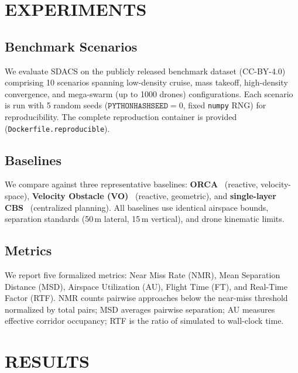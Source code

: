 
\section{EXPERIMENTS}

\subsection{Benchmark Scenarios}

We evaluate SDACS on the publicly released benchmark dataset
(CC-BY-4.0) comprising 10 scenarios spanning low-density cruise,
mass takeoff, high-density convergence, and mega-swarm (up to 1000
drones) configurations. Each scenario is run with 5 random seeds
($\texttt{PYTHONHASHSEED}=0$, fixed \texttt{numpy} RNG) for
reproducibility. The complete reproduction container is provided
(\texttt{Dockerfile.reproducible}).

\subsection{Baselines}

We compare against three representative baselines:
\textbf{ORCA}~\cite{vandenberg2011orca} (reactive, velocity-space),
\textbf{Velocity Obstacle (VO)}~\cite{fiorini1998vo} (reactive,
geometric), and \textbf{single-layer CBS}~\cite{sharon2015cbs}
(centralized planning). All baselines use identical airspace bounds,
separation standards (50\,m lateral, 15\,m vertical), and drone
kinematic limits.

\subsection{Metrics}

We report five formalized metrics: Near Miss Rate (NMR), Mean
Separation Distance (MSD), Airspace Utilization (AU), Flight Time
(FT), and Real-Time Factor (RTF). NMR counts pairwise approaches
below the near-miss threshold normalized by total pairs; MSD averages
pairwise separation; AU measures effective corridor occupancy; RTF
is the ratio of simulated to wall-clock time.

\section{RESULTS}

